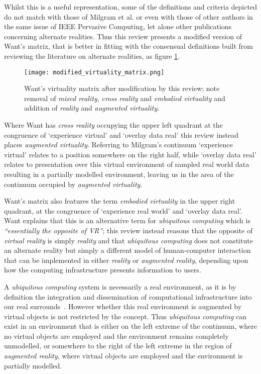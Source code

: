 Whilst this is a useful representation, some of the definitions and criteria depicted do not match with those of Milgram et al. or even with those of other authors in the same issue of IEEE Pervasive Computing, let alone other publications concerning alternate realities. Thus this review presents a modified version of Want's matrix, that is better in fitting with the consensual definitions built from reviewing the literature on alternate realities, as figure \ref{modified_virtuality_matrix.png}.

\begin{figure}[h]
\centering
\texttt{[image: modified\_virtuality\_matrix.png]}
\caption{Want's virtuality matrix after modification by this review; note removal of \textit{mixed reality}, \textit{cross reality} and \textit{embodied virtuality} and addition of \textit{reality} and \textit{augmented virtuality}.}
\label{modified_virtuality_matrix.png}
\end{figure}

Where Want has \textit{cross reality} occupying the upper left quadrant at the congruence of `experience virtual' and `overlay data real' this review instead places \textit{augmented virtuality}. Referring to Milgram's continuum `experience virtual' relates to a position somewhere on the right half, while `overlay data real' relates to presentation over this virtual environment of sampled real world data resulting in a partially modelled environment, leaving us in the area of the continuum occupied by \textit{augmented virtuality}.

Want's matrix also features the term \textit{embodied virtuality} in the upper right quadrant, at the congruence of `experience real world' and `overlay data real'. Want explains that this is an alternative term for \textit{ubiquitous computing} which is \textit{``essentially the opposite of VR''}; this review instead reasons that the opposite of \textit{virtual reality} is simply \textit{reality} and that \textit{ubiquitous computing} does not constitute an alternate reality but simply a different model of human-computer interaction that can be implemented in either \textit{reality} or \textit{augmented reality}, depending upon how the computing infrastructure presents information to users.

A \textit{ubiquitous computing} system is necessarily a real environment, as it is by definition the integration and dissemination of computational infrastructure into our real surrounds~\cite{York2004}. However whether this real environment is augmented by virtual objects is not restricted by the concept. Thus \textit{ubiquitous computing} can exist in an environment that is either on the left extreme of the continuum, where no virtual objects are employed and the environment remains completely unmodelled, or somewhere to the right of the left extreme in the region of \textit{augmented reality}, where virtual objects are employed and the environment is partially modelled.

